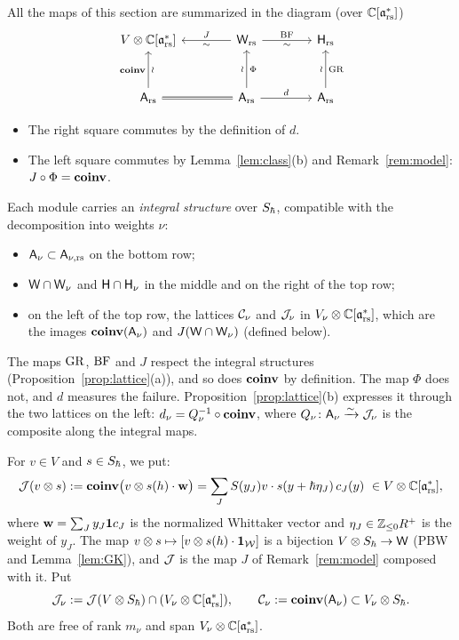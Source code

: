 \documentclass{article}
\theoremstyle{plain}
\theoremstyle{definition}
\theoremstyle{remark}
\numberwithin{equation}{section}
\begin{document}
All the maps of this section are summarized in the diagram (over $\mathbb{C}[\mathfrak{a}^*_{\mathrm{rs}}]$)
\begin{equation}\label{eq:disc-diagram}
\begin{tikzcd}[column sep=4em,row sep=3em]
V\otimes\Crs
& \sfW_\rs\arrow[l,"J"',"\sim"]\arrow[r,"\BF","\sim"']
& \sfH_\rs
\\
\sfA_\rs\arrow[u,"\coinv","\wr"']\arrow[r,equal]
& \sfA_\rs\arrow[u,"\Phi"',"\wr"]\arrow[r,"d"]
& \sfA_\rs\arrow[u,"\GR"',"\wr"]
\end{tikzcd}
\end{equation}
\begin{itemize}
\item The right square commutes by the definition of $d$.
\item The left square commutes by Lemma~\ref{lem:class}(b) and Remark~\ref{rem:model}: $J\circ\Phi=\operatorname{\mathbf{coinv}}$.
\end{itemize}
Each module carries an \emph{integral structure} over $S_\hbar$, compatible with the decomposition into weights $\nu$:
\begin{itemize}
\item $\mathsf A_\nu\subset\mathsf A_{\nu,\mathrm{rs}}$ on the bottom row;
\item $\mathsf W\cap\mathsf W_\nu$ and $\mathsf H\cap\mathsf H_\nu$ in the middle and on the right of the top row;
\item on the left of the top row, the lattices $\mathcal C_\nu$ and $\mathcal J_\nu$ in $V_\nu\otimes\mathbb{C}[\mathfrak{a}^*_{\mathrm{rs}}]$, which are the images $\operatorname{\mathbf{coinv}}(\mathsf A_\nu)$ and $J(\mathsf W\cap\mathsf W_\nu)$ (defined below).
\end{itemize}
The maps $\mathrm{GR}$, $\mathrm{BF}$ and $J$ respect the integral structures (Proposition~\ref{prop:lattice}(a)), and so does $\operatorname{\mathbf{coinv}}$ by definition. The map $\Phi$ does not, and $d$ measures the failure. Proposition~\ref{prop:lattice}(b) expresses it through the two lattices on the left: $d_\nu=Q_\nu^{-1}\circ\operatorname{\mathbf{coinv}}$, where $Q_\nu\colon\mathsf A_\nu\xrightarrow{\sim}\mathcal J_\nu$ is the composite along the integral maps.

For $v\in V$ and $s\in S_\hbar$, we put:
\[
\mathcal J(v\otimes s):=\operatorname{\mathbf{coinv}}\bigl(v\otimes s(h)\cdot\mathbf w\bigr)=\sum_JS(y_J)v\cdot s(y+\hbar\eta_J)\,c_J(y)\ \in V\otimes\mathbb{C}[\mathfrak{a}^*_{\mathrm{rs}}],
\]
where $\mathbf w=\sum_Jy_J\mathbf 1 c_J$ is the normalized Whittaker vector and $\eta_J\in\mathbb{Z}_{\le0}R^+$ is the weight of $y_J$. The map $v\otimes s\mapsto[v\otimes s(h)\cdot\mathbf 1_{\mathcal{W}}]$ is a bijection $V\otimes S_\hbar\to\mathsf W$ (PBW and Lemma~\ref{lem:GK}), and $\mathcal J$ is the map $J$ of Remark~\ref{rem:model} composed with it. Put
\[
\mathcal J_\nu:=\mathcal J(V\otimes S_\hbar)\cap(V_\nu\otimes\mathbb{C}[\mathfrak{a}^*_{\mathrm{rs}}]),\qquad\mathcal C_\nu:=\operatorname{\mathbf{coinv}}(\mathsf A_\nu)\subset V_\nu\otimes S_\hbar .
\]
Both are free of rank $m_\nu$ and span $V_\nu\otimes\mathbb{C}[\mathfrak{a}^*_{\mathrm{rs}}]$.
\end{document}
